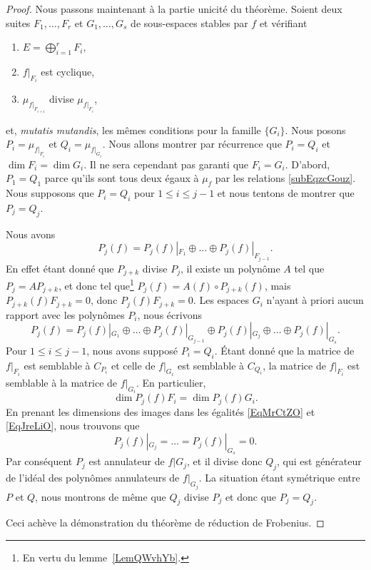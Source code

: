 \begin{proof}
	Nous passons maintenant à la partie unicité du théorème. Soient deux suites \( F_1,\ldots, F_r\) et \( G_1,\ldots, G_s\) de sous-espaces stables par \( f\) et vérifiant
	\begin{enumerate}
		\item
		      \( E=\bigoplus_{i=1}^rF_i\),
		\item
		      \( f|_{F_i}\) est cyclique,
		\item
		      \( \mu_{f|_{F_{i+1}}}\) divise \( \mu_{f|_{F_i}}\),
	\end{enumerate}
	et, \emph{mutatis mutandis}, les mêmes conditions pour la famille \( \{ G_i \}\). Nous posons \( P_i=\mu_{f|_{F_i}}\) et \( Q_i=\mu_{f|_{G_i}}\). Nous allons montrer par récurrence que \( P_i=Q_i\) et \( \dim F_i=\dim G_i\). Il ne sera cependant pas garanti que \( F_i=G_i\). D'abord, \( P_1=Q_1\) parce qu'ils sont tous deux égaux à \( \mu_f\) par les relations \eqref{subEqzcGouz}. Nous supposons que \( P_i=Q_i\) pour \( 1\leq i\leq j-1\) et nous tentons de montrer que \( P_j=Q_j\).

	Nous avons
	\begin{equation}    \label{EqMrCtZO}
		P_j(f)=P_j(f)|_{F_1}\oplus\ldots\oplus P_j(f)|_{F_{j-1}}.
	\end{equation}
	En effet étant donné que \( P_{j+k}\) divise \( P_j\), il existe un polynôme \( A\) tel que \( P_j=AP_{j+k}\), et donc tel que\footnote{En vertu du lemme~\ref{LemQWvhYb}.} \( P_{j}(f)=A(f)\circ P_{j+k}(f)\), mais \( P_{j+k}(f)F_{j+k}=0\), donc \( P_j(f)F_{j+k}=0\). Les espaces \( G_i\) n'ayant à priori aucun rapport avec les polynômes \( P_i\), nous écrivons
	\begin{equation}    \label{EqJreLiO}
		P_j(f)=P_j(f)|_{G_1}\oplus\ldots\oplus P_j(f)|_{G_{j-1}}\oplus P_j(f)|_{G_j}\oplus\ldots\oplus P_j(f)|_{G_s}.
	\end{equation}
	Pour \( 1\leq i\leq j-1\), nous avons supposé \( P_i=Q_i\). Étant donné que la matrice de \( f|_{F_i}\) est semblable à \( C_{P_i}\) et celle de \( f|_{G_i}\) est semblable à \( C_{Q_i}\), la matrice de \( f|_{F_i}\) est semblable à la matrice de \( f|_{G_i}\). En particulier,
	\begin{equation}
		\dim P_j(f)F_i=\dim P_j(f)G_i.
	\end{equation}
	En prenant les dimensions des images dans les égalités \eqref{EqMrCtZO} et \eqref{EqJreLiO}, nous trouvons que
	\begin{equation}
		P_j(f)|_{G_j}=\ldots=P_j(f)|_{G_s}=0.
	\end{equation}
	Par conséquent \( P_j\) est annulateur de \( f|G_j\), et il divise donc \( Q_j\), qui est générateur de l'idéal des polynômes annulateurs de \( f|_{G_j}\). La situation étant symétrique entre \( P\) et \( Q\), nous montrons de même que \( Q_j\) divise \( P_j\) et donc que \( P_j=Q_j\).

	Ceci achève la démonstration du théorème de réduction de Frobenius.

\end{proof}

